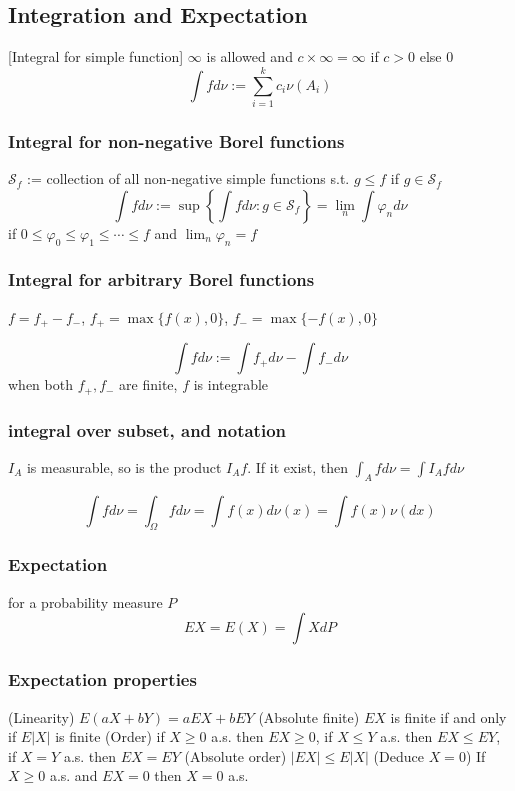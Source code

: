 \subsection{Integration and Expectation}

[Integral for simple function] $\infty$ is allowed and $c\times \infty=\infty$ if $c>0$ else $0$
$$\int f d\nu := \sum_{i=1}^k c_i \nu(A_i)$$

\subsubsection{Integral for non-negative Borel functions}
$\mathcal{S}_f$ := collection of all non-negative simple functions s.t. $g\leq f$ if $g\in\mathcal{S}_f$
$$\int f d\nu := \sup \left\{ \int f d\nu: g\in \mathcal{S}_f \right\} = \lim_n \int \varphi_n d\nu$$
if $0\leq \varphi_0 \leq \varphi_1 \leq \cdots \leq f$ and $\lim_n \varphi_n = f$

\subsubsection{Integral for arbitrary Borel functions}
$f = f_+ - f_-$, $f_+ = \max\{f(x), 0\}$, $f_- = \max\{ -f(x), 0 \}$

$$\int f d\nu := \int f_+ d\nu - \int f_- d\nu$$
when both $f_+, f_-$ are finite, $f$ is integrable

\subsubsection{integral over subset, and notation}
$I_A$ is measurable, so is the product $I_A f$. If it exist, then $\int_A f d\nu = \int I_A f d\nu$

$$\int f d\nu = \int_\Omega f d\nu = \int f(x) d\nu(x) = \int f(x) \nu (dx)$$

\subsubsection{Expectation}

for a probability measure $P$
$$EX=E(X)=\int X dP$$

\subsubsection{Expectation properties}
(Linearity) $E(aX + bY) = aEX + bEY$
\newline (Absolute finite) $EX$ is finite if and only if $E|X|$ is finite
\newline(Order) if $X\geq 0$ a.s. then $EX\geq 0$, if $X\leq Y$ a.s. then $EX \leq EY$, if $X=Y$ a.s. then $EX=EY$
\newline (Absolute order) $|EX|\leq E|X|$
\newline (Deduce $X=0$) If $X\geq 0$ a.s. and $EX=0$ then $X=0$ a.s.

